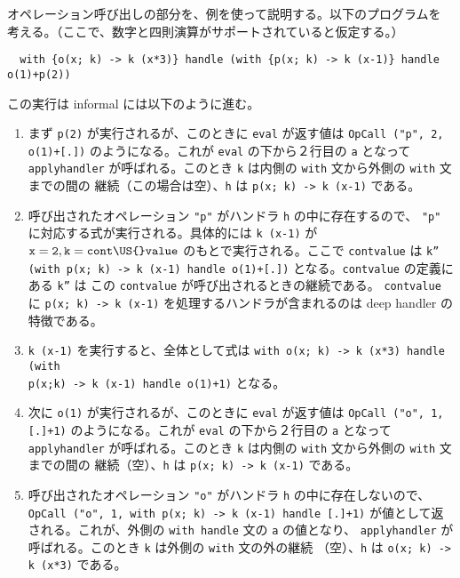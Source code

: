 オペレーション呼び出しの部分を、例を使って説明する。以下のプログラムを
考える。（ここで、数字と四則演算がサポートされていると仮定する。）
\begin{verbatim}
  with {o(x; k) -> k (x*3)} handle (with {p(x; k) -> k (x-1)} handle o(1)+p(2))
\end{verbatim}
この実行は informal には以下のように進む。
\begin{enumerate}
\item
まず \texttt{p(2)} が実行されるが、このときに \texttt{eval} が返す値は
   \texttt{OpCall ("p", 2, o(1)+[.])}
   のようになる。これが \texttt{eval} の下から２行目の \texttt{a} となって \texttt{apply\US{}handler}
   が呼ばれる。このとき \texttt{k} は内側の \texttt{with} 文から外側の \texttt{with} 文までの間の
   継続（この場合は空）、\texttt{h} は \texttt{\LBR{}p(x; k) -> k (x-1)\RBR} である。
\item
呼び出されたオペレーション \texttt{"p"} がハンドラ \texttt{h} の中に存在するので、 \texttt{"p"}
   に対応する式が実行される。具体的には \texttt{k (x-1)} が $\texttt{x}=\texttt{2}, \texttt{k}=\texttt{cont\US{}value}$
   のもとで実行される。ここで \texttt{cont\US{}value} は
   \texttt{k'' (with {p(x; k) -> k (x-1)} handle o(1)+[.])}
   となる。\texttt{cont\US{}value} の定義にある \texttt{k''} は この \texttt{cont\US{}value} が呼び出されるときの継続である。
   \texttt{cont\US{}value} に \texttt{\LBR{}p(x; k) -> k (x-1)\RBR} を処理するハンドラが含まれるのは
   deep handler の特徴である。
\item
\texttt{k (x-1)} を実行すると、全体として式は
   \texttt{with \LBR{}o(x; k) -> k (x*3)\RBR{} handle (with\\\LBR{}p(x;k) -> k (x-1)\RBR{} handle o(1)+1)}
   となる。
\item
次に \texttt{o(1)} が実行されるが、このときに \texttt{eval} が返す値は
   \texttt{OpCall ("o", 1, [.]+1)}
   のようになる。これが \texttt{eval} の下から２行目の \texttt{a} となって \texttt{apply\US{}handler}
   が呼ばれる。このとき \texttt{k} は内側の \texttt{with} 文から外側の \texttt{with} 文までの間の
   継続（空）、\texttt{h} は \texttt{\LBR{}p(x; k) -> k (x-1)\RBR} である。
\item
呼び出されたオペレーション \texttt{"o"} がハンドラ \texttt{h} の中に存在しないので、
   \texttt{OpCall ("o", 1, with \LBR{}p(x; k) -> k (x-1)\RBR{} handle [.]+1)}
   が値として返される。これが、外側の \texttt{with handle} 文の \texttt{a} の値となり、
   \texttt{apply\US{}handler} が呼ばれる。このとき \texttt{k} は外側の \texttt{with} 文の外の継続
   （空）、\texttt{h} は \texttt{\LBR{}o(x; k) -> k (x*3)\RBR} である。

\end{enumerate}
